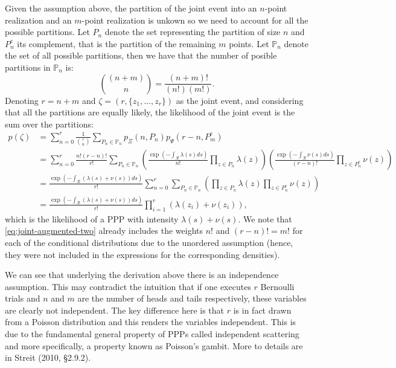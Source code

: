 \documentclass{article}
\newcommand{\calR}{\mathcal{R}}
\newcommand{\ls}{\lambda(s)}
\newcommand{\ns}{\nu(s)}
\newcommand{\bbP}{\mathbb{P}}
\begin{document}
	Given the assumption above, the partition of the joint event into an $n$-point realization and an $m$-point realization is unkown so we need to account for all the possible partitions. Let $P_n$ denote the set representing the partition of size $n$ and $P_n^c$ its complement, that is the partition of the remaining $m$ points. Let $\bbP_n$ denote the set of all possible partitions, then we have that the number of posible partitions in $\bbP_n$ is: 
	\begin{equation}
		 {(n+m) \choose n} = \frac{(n+m)!}{(n!) (m!)}  \text{.}
	\end{equation}
	Denoting $r=n + m$ and $\zeta = (r, \{z_1, \ldots, z_r\})$ as the joint event, and considering that all the partitions are equally likely,  the likelihood of the joint event is the sum over the partitions:
	\begin{align}
		p(\zeta) &= \sum_{n=0}^r \frac{1}{{r \choose n }} \sum_{P_n \in \bbP_n} p_{\Xi}(n, P_n)  p_{\Psi}(r-n, P_m^c ) \\
		&= \sum_{n=0}^r  \frac{n! (r-n)!}{r!} \sum_{P_n \in \bbP_n} 
		\label{eq:joint-augmented-two}
		\left( \frac{ \exp\left(-\int_{\calR} \ls ds\right) }{n!} \prod_{z \in P_n} \lambda(z) \right)
		\left(  \frac{ \exp\left(-\int_{\calR} \ns ds\right) }{(r-n)!}  \prod_{z \in P_n^c} \nu(z) \right) \\
		&= \frac{ \exp\left(-\int_{\calR} (\ls + \ns) ds\right) }{r!}  \sum_{n=0}^r  \sum_{P_n \in \bbP_n} \left(  \prod_{z \in P_n} \lambda(z)    \prod_{z \in P_n^c} \nu(z) \right)\\
		& =  \frac{ \exp\left(-\int_{\calR} (\ls + \ns) ds\right) }{r!}   \prod_{i=1}^r (  \lambda(z_i) + \nu(z_i) ) \text{,}
	\end{align}
	which is the likelihood of a \gls{PPP} with intensity $\lambda(s) + \nu(s)$.  We note that \cref{eq:joint-augmented-two} already includes the weights $n!$ and $(r-n)! = m!$ for each of the conditional distributions due to the unordered assumption (hence, they were not included in the expressions for the corresponding densities). 
	 
	 We can see that underlying the derivation above there is an independence assumption. This may contradict the intuition that if one executes $r$ Bernoulli trials and $n$ and $m$ are the number of heads and tails respectively, these variables are clearly not independent.  The key difference here is that $r$ is in fact drawn from a Poisson distribution and this renders the variables independent. This is due to the fundamental general property of \glspl{PPP} called independent scattering and more specifically, a property known  as Poisson's gambit. More to details are in Streit (2010, \S 2.9.2).  
	  
\end{document}
